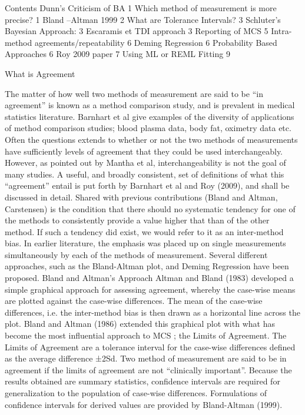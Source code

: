 Contents
Dunn’s Criticism of BA	1
Which method of measurement is more precise?	1
Bland –Altman 1999	2
What are Tolerance Intervals?	3
Schluter’s Bayesian Approach:	3
Escaramis et TDI approach	3
Reporting of MCS	5
Intra-method agreements/repeatability	6
Deming Regression	6
Probability Based Approaches	6
Roy 2009 paper	7
Using ML or REML Fitting	9


What is Agreement

The matter of how well two methods of measurement are said to be “in agreement” is known as a method comparison study, and is prevalent in medical statistics literature.  Barnhart et al give examples of the diversity of applications of method comparison studies; blood plasma data, body fat, oximetry data etc. 
Often the questions extends to whether or not the two methods of measurements have sufficiently levels of agreement that they could be used interchangeably. However, as pointed out by Mantha et al, interchangeability is not the goal of many studies.
A useful, and broadly consistent, set of definitions of what this “agreement” entail is put forth by Barnhart et al and Roy (2009), and shall be discussed in detail.
Shared with previous contributions (Bland and Altman, Carstensen) is the condition that there should no systematic tendency for one of the methods to consistently provide a value higher that than of the other method. If such a tendency did exist, we would refer to it as an inter-method bias.
In earlier literature, the emphasis was placed up on single measurements simultaneously by each of the methods of measurement. Several different approaches, such as the Bland-Altman plot, and Deming Regression have been proposed. 
Bland  and Altman’s Approach
Altman and Bland (1983) developed a simple graphical approach for assessing agreement,  whereby the case-wise means are plotted against the case-wise differences. The mean of the case-wise differences, i.e. the inter-method bias is then drawn as a horizontal line across the plot. 
Bland and Altman (1986) extended this graphical plot with what has become the most influential approach to MCS ; the Limits of Agreement. The Limits of Agreement are a tolerance interval for the case-wise differences defined as the average difference ±2Sd. Two method of measurement are said to be in agreement if the limits of agreement are not “clinically important”.
Because the results obtained are summary statistics, confidence intervals are required for generalization to the population of case-wise differences. Formulations of confidence intervals for derived values are provided by Bland-Altman (1999).
